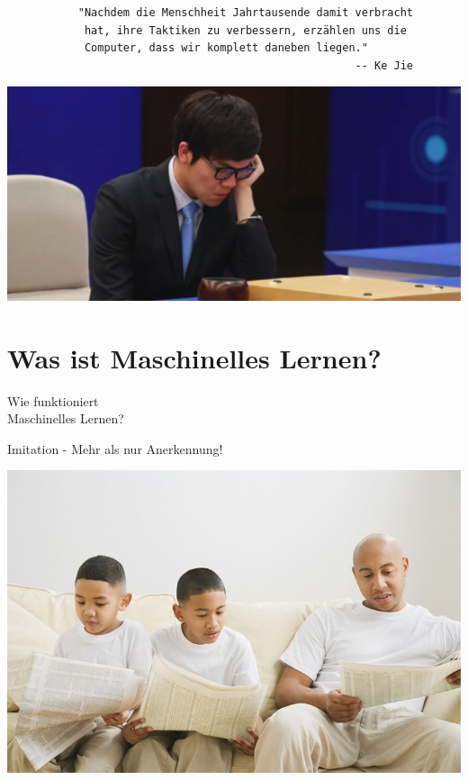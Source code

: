 \documentclass[aspectratio=169,x11names]{beamer}
\begin{document}
\begin{frame}[fragile]
\small
\begin{verbatim}
           "Nachdem die Menschheit Jahrtausende damit verbracht
            hat, ihre Taktiken zu verbessern, erzählen uns die
            Computer, dass wir komplett daneben liegen."
                                                      -- Ke Jie
\end{verbatim}

\begin{center}
\includegraphics[scale=0.65]{images/kejie.png} 
\end{center}
\end{frame}


\section{Was ist Maschinelles Lernen?}

\begin{frame}
\begin{center}
\huge
Wie funktioniert\\Maschinelles Lernen?
\end{center}
\end{frame}

\begin{frame}
\begin{center}
\Large Imitation - Mehr als nur Anerkennung!
\medskip\medskip

\includegraphics[scale=0.35]{images/imitation}
\end{center}
\end{frame}
\end{document}

